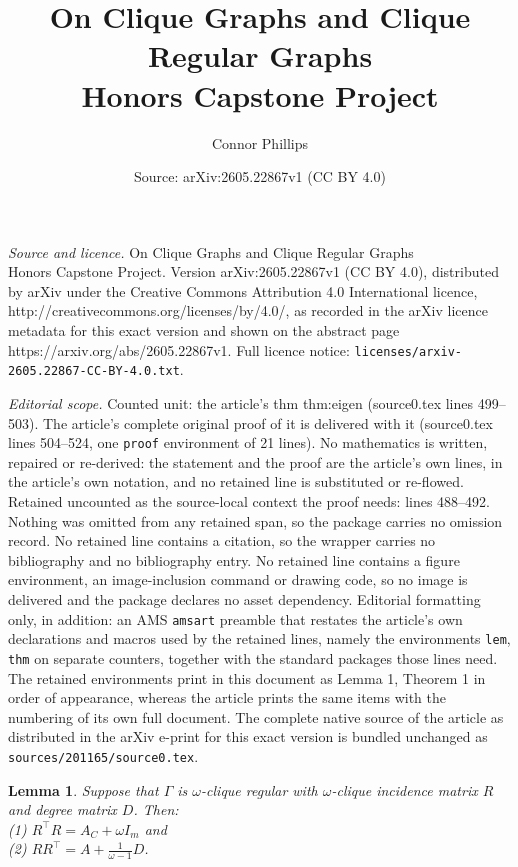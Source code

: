 \documentclass[10pt,a4paper]{amsart}
\title{\Huge On Clique Graphs and Clique Regular Graphs \\[1em] \Large Honors Capstone Project}
\author{Connor Phillips}
\date{Source: arXiv:2605.22867v1 (CC BY 4.0)}
\newtheorem{lem}{Lemma}
\begin{document}
\maketitle

\noindent\emph{Source and licence.} \Huge On Clique Graphs and Clique Regular Graphs \\[1em] \Large Honors Capstone Project. Version arXiv:2605.22867v1 (CC BY 4.0), distributed by arXiv under the Creative Commons Attribution 4.0 International licence, http://creativecommons.org/licenses/by/4.0/, as recorded in the arXiv licence metadata for this exact version and shown on the abstract page https://arxiv.org/abs/2605.22867v1. Full licence notice: \texttt{licenses/arxiv-2605.22867-CC-BY-4.0.txt}.\par\smallskip

\noindent\textit{Editorial scope.} Counted unit: the article's thm thm:eigen (source0.tex lines 499--503). The article's complete original proof of it is delivered with it (source0.tex lines 504--524, one \texttt{proof} environment of 21 lines). No mathematics is written, repaired or re-derived: the statement and the proof are the article's own lines, in the article's own notation, and no retained line is substituted or re-flowed.  Retained uncounted as the source-local context the proof needs: lines 488--492.  Nothing was omitted from any retained span, so the package carries no omission record.  No retained line contains a citation, so the wrapper carries no bibliography and no bibliography entry.  No retained line contains a figure environment, an image-inclusion command or drawing code, so no image is delivered and the package declares no asset dependency.  Editorial formatting only, in addition: an AMS \texttt{amsart} preamble that restates the article's own declarations and macros used by the retained lines, namely the environments \texttt{lem}, \texttt{thm} on separate counters, together with the standard packages those lines need.  The retained environments print in this document as Lemma 1, Theorem 1 in order of appearance, whereas the article prints the same items with the numbering of its own full document.  The complete native source of the article as distributed in the arXiv e-print for this exact version is bundled unchanged as \texttt{sources/201165/source0.tex}.
\begin{lem} \label{lem:blockmat}
Suppose that $\Gamma$ is $\omega$-clique regular with $\omega$-clique incidence matrix $R$ and degree matrix $D$. Then:\vspace{0.2cm} \\
           \hspace*{0.5cm} (1) $R^\top R=A_C + \omega I_m$ and  \\
           \hspace*{0.5cm} (2) $RR^\top  = A + \frac{1}{\omega -1}D$. \vspace{0.2cm}
\end{lem}
\end{document}
